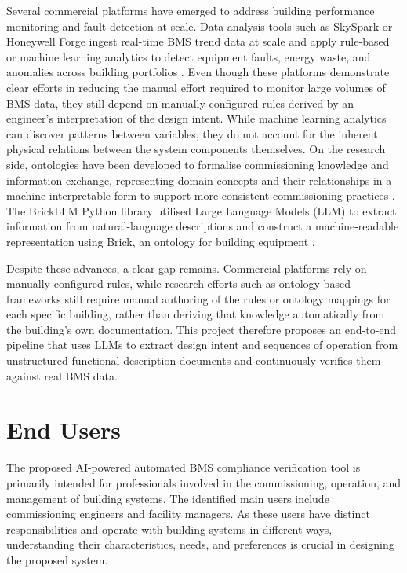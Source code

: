 \documentclass{article}
\begin{document}
Several commercial platforms have emerged to address building performance monitoring and fault detection at scale. Data analysis tools such as SkySpark or Honeywell Forge ingest real-time BMS trend data at scale and apply rule-based or machine learning analytics to detect equipment faults, energy waste, and anomalies across building portfolios \parencite{skyspark,honeywellforge}. Even though these platforms demonstrate clear efforts in reducing the manual effort required to monitor large volumes of BMS data, they still depend on manually configured rules derived by an engineer's interpretation of the design intent. While machine learning analytics can discover patterns between variables, they do not account for the inherent physical relations between the system components themselves. On the research side, ontologies have been developed to formalise commissioning knowledge and information exchange, representing domain concepts and their relationships in a machine-interpretable form to support more consistent commissioning practices \parencite{lee2019}. The BrickLLM Python library utilised Large Language Models (LLM) to extract information from natural-language descriptions and construct a machine-readable representation using Brick, an ontology for building equipment \parencite{perini2025,brick_ontology}.

Despite these advances, a clear gap remains. Commercial platforms rely on manually configured rules, while research efforts such as ontology-based frameworks still require manual authoring of the rules or ontology mappings for each specific building, rather than deriving that knowledge automatically from the building's own documentation. This project therefore proposes an end-to-end pipeline that uses LLMs to extract design intent and sequences of operation from unstructured functional description documents and continuously verifies them against real BMS data.

\section{End Users}

The proposed AI-powered automated BMS compliance verification tool is primarily intended for professionals involved in the commissioning, operation, and management of building systems. The identified main users include commissioning engineers and facility managers. As these users have distinct responsibilities and operate with building systems in different ways, understanding their characteristics, needs, and preferences is crucial in designing the proposed system.
\end{document}
